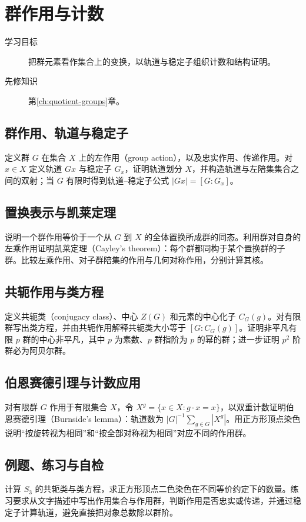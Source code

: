 \documentclass[UTF8,12pt,a4paper,fontset=fandol]{ctexbook}
\begin{document}
\chapter{群作用与计数}\label{ch:actions}

\begin{description}
  \item[学习目标] 把群元素看作集合上的变换，以轨道与稳定子组织计数和结构证明。
  \item[先修知识] 第\ref{ch:quotient-groups}章。
\end{description}

\section{群作用、轨道与稳定子}
定义群 $G$ 在集合 $X$ 上的左作用（group action），以及忠实作用、传递作用。对 $x\in X$ 定义轨道 $Gx$ 与稳定子 $G_x$，证明轨道划分 $X$，并构造轨道与左陪集集合之间的双射；当 $G$ 有限时得到轨道--稳定子公式 $|Gx|=[G:G_x]$。

\section{置换表示与凯莱定理}
说明一个群作用等价于一个从 $G$ 到 $X$ 的全体置换所成群的同态。利用群对自身的左乘作用证明凯莱定理（Cayley's theorem）：每个群都同构于某个置换群的子群。比较左乘作用、对子群陪集的作用与几何对称作用，分别计算其核。

\section{共轭作用与类方程}
定义共轭类（conjugacy class）、中心 $Z(G)$ 和元素的中心化子 $C_G(g)$。对有限群写出类方程，并由共轭作用解释共轭类大小等于 $[G:C_G(g)]$。证明非平凡有限 $p$ 群的中心非平凡，其中 $p$ 为素数、$p$ 群指阶为 $p$ 的幂的群；进一步证明 $p^2$ 阶群必为阿贝尔群。

\section{伯恩赛德引理与计数应用}
对有限群 $G$ 作用于有限集合 $X$，令 $X^g=\{x\in X:g\cdot x=x\}$，以双重计数证明伯恩赛德引理（Burnside's lemma）：轨道数为 $|G|^{-1}\sum_{g\in G}|X^g|$。用正方形顶点染色说明“按旋转视为相同”和“按全部对称视为相同”对应不同的作用群。

\section{例题、练习与自检}
计算 $S_3$ 的共轭类与类方程，求正方形顶点二色染色在不同等价约定下的数量。练习要求从文字描述中写出作用集合与作用群，判断作用是否忠实或传递，并通过稳定子计算轨道，避免直接把对象总数除以群阶。
\end{document}

